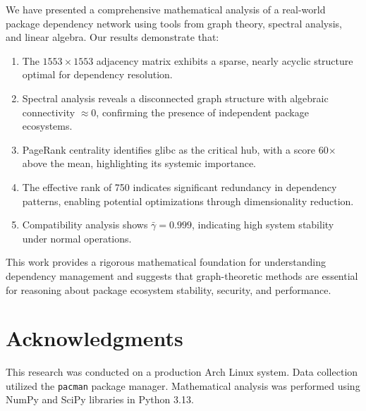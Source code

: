 \documentclass[11pt,a4paper]{article}
\begin{document}
We have presented a comprehensive mathematical analysis of a real-world package dependency network using tools from graph theory, spectral analysis, and linear algebra. Our results demonstrate that:

\begin{enumerate}
\item The $1553 \times 1553$ adjacency matrix exhibits a sparse, nearly acyclic structure optimal for dependency resolution.

\item Spectral analysis reveals a disconnected graph structure with algebraic connectivity $\approx 0$, confirming the presence of independent package ecosystems.

\item PageRank centrality identifies glibc as the critical hub, with a score 60$\times$ above the mean, highlighting its systemic importance.

\item The effective rank of 750 indicates significant redundancy in dependency patterns, enabling potential optimizations through dimensionality reduction.

\item Compatibility analysis shows $\bar{\gamma} = 0.999$, indicating high system stability under normal operations.
\end{enumerate}

This work provides a rigorous mathematical foundation for understanding dependency management and suggests that graph-theoretic methods are essential for reasoning about package ecosystem stability, security, and performance.

\section*{Acknowledgments}

This research was conducted on a production Arch Linux system. Data collection utilized the \texttt{pacman} package manager. Mathematical analysis was performed using NumPy and SciPy libraries in Python 3.13.
\end{document}
